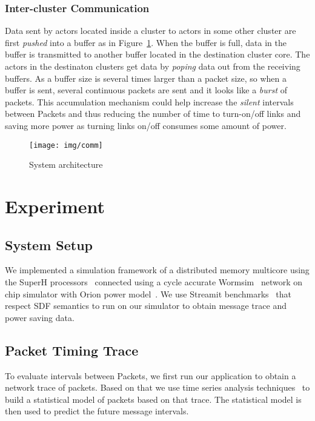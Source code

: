 \documentclass[12pt]{article}
\begin{document}
\subsubsection{Inter-cluster Communication}\label{sec:cluster_comm}
Data sent by actors located inside a cluster to actors in some other
cluster are first \textit{pushed} into a buffer as in Figure~\ref{fig:comm}. When the buffer
is full, data in the buffer is transmitted to another buffer located in the
destination cluster core. The actors in the destinaton clusters get data by
\textit{poping} data out from the receiving buffers. As a buffer size is
several times larger than a packet size, so when a buffer is sent, several
continuous packets are sent and it looks like a \textit{burst} of packets. This
accumulation mechanism could help increase the \textit{silent} intervals between
Packets and thus reducing the number of time to turn-on/off links and saving
more power as turning links on/off consumes some amount of power.


\begin{figure}[ht!]
\centering
\texttt{[image: img/comm]}
\caption{System architecture}\label{fig:comm}
\end{figure}

\section{Experiment}
\subsection{System Setup}
We implemented a simulation framework of a distributed memory multicore using
the SuperH processors~\cite{Stanley-MarbellSunflower} connected using a
cycle accurate Wormsim~\cite{Wormsim} network on chip simulator with Orion power
model~\cite{WangOrion}. We use Streamit benchmarks~\cite{ThiesStreamIt} that
respect SDF semantics to run on our simulator to obtain message trace and power
saving data.

\subsection{Packet Timing Trace}
To evaluate intervals between Packets, we first run our application to obtain a
network trace of packets. Based on that we use time series analysis
techniques~\cite{BrillingerTimeSeries, ShumwayTimeSeries} to build a statistical
model of packets based on that trace. The statistical model is then used to
predict the future message intervals.
\end{document}
